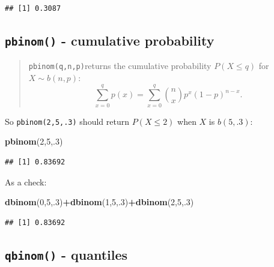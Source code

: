 \documentclass[
]{book}
\newenvironment{Shaded}{\begin{snugshade}}{\end{snugshade}}
\newcommand{\DecValTok}[1]{\textcolor[rgb]{0.00,0.00,0.81}{#1}}
\newcommand{\FunctionTok}[1]{\textcolor[rgb]{0.13,0.29,0.53}{\textbf{#1}}}
\newcommand{\NormalTok}[1]{#1}
\newcommand{\SpecialCharTok}[1]{\textcolor[rgb]{0.81,0.36,0.00}{\textbf{#1}}}
\theoremstyle{definition}
\theoremstyle{definition}
\theoremstyle{definition}
\theoremstyle{definition}
\theoremstyle{remark}
\begin{document}
\begin{verbatim}
## [1] 0.3087
\end{verbatim}

\subsection*{\texorpdfstring{\texttt{pbinom()} - cumulative probability}{pbinom() - cumulative probability}}\label{pbinom---cumulative-probability}

\begin{quote}
\texttt{pbinom(q,n,p)}returns the cumulative probability \(P(X \leq q)\) for \(X \sim b(n,p)\): \[\sum_{x=0}^q p(x)=\sum_{x=0}^q\binom{n}{x}p^x(1-p)^{n-x}.\]
\end{quote}

So \texttt{pbinom(2,5,.3)} should return \(P(X \leq 2)\) when \(X\) is \(b(5,.3)\):

\begin{Shaded}
\begin{Highlighting}[]
\FunctionTok{pbinom}\NormalTok{(}\DecValTok{2}\NormalTok{,}\DecValTok{5}\NormalTok{,.}\DecValTok{3}\NormalTok{)}
\end{Highlighting}
\end{Shaded}

\begin{verbatim}
## [1] 0.83692
\end{verbatim}

As a check:

\begin{Shaded}
\begin{Highlighting}[]
\FunctionTok{dbinom}\NormalTok{(}\DecValTok{0}\NormalTok{,}\DecValTok{5}\NormalTok{,.}\DecValTok{3}\NormalTok{)}\SpecialCharTok{+}\FunctionTok{dbinom}\NormalTok{(}\DecValTok{1}\NormalTok{,}\DecValTok{5}\NormalTok{,.}\DecValTok{3}\NormalTok{)}\SpecialCharTok{+}\FunctionTok{dbinom}\NormalTok{(}\DecValTok{2}\NormalTok{,}\DecValTok{5}\NormalTok{,.}\DecValTok{3}\NormalTok{)}
\end{Highlighting}
\end{Shaded}

\begin{verbatim}
## [1] 0.83692
\end{verbatim}

\subsection*{\texorpdfstring{\texttt{qbinom()} - quantiles}{qbinom() - quantiles}}\label{qbinom---quantiles}
\end{document}

